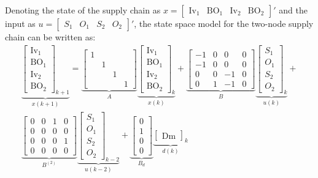 \documentclass{elsarticle}
\newcommand{\BO}{\textrm{BO}}
\newcommand{\Inv}{\textrm{Iv}}
\newcommand{\Dem}{\textrm{Dm}}
\theoremstyle{definition}
\begin{document}
Denoting the state of the supply chain as $x = \begin{bmatrix} \Inv_1
  & \BO_1 & \Inv_2 & \BO_2 \end{bmatrix}'$ and the input as $u
= \begin{bmatrix} S_1 & O_1 & S_2 & O_2 \end{bmatrix}'$, the state
space model for the two-node supply chain can be written as:
\begin{multline}
\label{eq:model0}
\underbrace{\begin{bmatrix}\Inv_1\\\BO_1\\\Inv_2 \\
    \BO_2\end{bmatrix}_{k+1}}_{x(k+1)} = 
\underbrace{\begin{bmatrix} 1 & & &
 \\ & 1 & &\\ & & 1 & \\ & & & 1\end{bmatrix}}_{A}
\underbrace{\begin{bmatrix}\Inv_1\\\BO_1\\\Inv_2 \\
    \BO_2\end{bmatrix}_{k}}_{x(k)}+
\underbrace{\begin{bmatrix}-1&0 &0 &0 \\-1&0 &0 &0 \\
0&0 & -1 &0 \\0 & 1 & -1 &0 \end{bmatrix}}_{B}
\underbrace{\begin{bmatrix}S_{1}\\O_{1}\\S_{2}\\O_{2}\end{bmatrix}_{k}}_{u(k)}+\\
\underbrace{\begin{bmatrix} 0&0 &1 &0 \\0 &0 &0 &0 \\
0&0 &0  &1 \\0 & 0 &0  &0 \end{bmatrix}}_{B^{(2)}}
\underbrace{\begin{bmatrix}S_{1}\\O_{1}\\S_{2}\\O_{2}\end{bmatrix}_{k-2}}_{u(k-2)}+
\underbrace{\begin{bmatrix}0 \\ 1 \\0 \\0 \end{bmatrix}}_{B_d}\underbrace{\begin{bmatrix}\Dem\end{bmatrix}_{k}}_{d(k)}
\end{multline}
\end{document}
